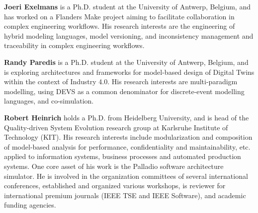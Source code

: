 \medskip
\noindent
\textbf{Joeri Exelmans} is a Ph.D. student at the University of Antwerp, Belgium, and has worked on a Flanders Make project aiming to facilitate collaboration in complex engineering workflows. His research interests are the engineering of hybrid modeling languages, model versioning, and inconsistency management and traceability in complex engineering workflows.

\medskip
\noindent
\textbf{Randy Paredis} is a Ph.D. student at the University of Antwerp, Belgium, and is exploring architectures and frameworks for model-based design of Digital Twins within the context of Industry 4.0. His research interests are multi-paradigm modelling, using DEVS as a common denominator for discrete-event modelling languages, and co-simulation.


\medskip
\noindent
\textbf{Robert Heinrich} holds a Ph.D. from Heidelberg University, and is head of the Quality-driven System Evolution research group at Karlsruhe Institute of Technology (KIT). His research interests include modularization
and composition of model-based analysis for performance, confidentiality and maintainability, etc. applied to information systems, business processes and automated production systems. One core asset of his work is the Palladio software architecture simulator. He is involved in the organization committees of several international conferences, established and organized various workshops, is reviewer for international premium journals (IEEE TSE and IEEE Software), and academic funding agencies.

